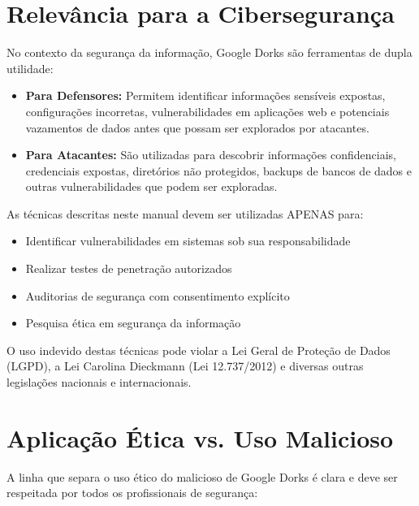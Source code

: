 \documentclass[12pt,a4paper]{book}
\begin{document}
\section{Relevância para a Cibersegurança}

No contexto da segurança da informação, Google Dorks são ferramentas de dupla utilidade:

\begin{itemize}
    \item \textbf{\textcolor{verdeestabilidade}{Para Defensores:}} Permitem identificar informações sensíveis expostas, configurações incorretas, vulnerabilidades em aplicações web e potenciais vazamentos de dados antes que possam ser explorados por atacantes.
    
    \item \textbf{\textcolor{vermelhoperigo}{Para Atacantes:}} São utilizadas para descobrir informações confidenciais, credenciais expostas, diretórios não protegidos, backups de bancos de dados e outras vulnerabilidades que podem ser exploradas.
\end{itemize}

\begin{alertbox}
As técnicas descritas neste manual devem ser utilizadas APENAS para:
\begin{itemize}
    \item Identificar vulnerabilidades em sistemas sob sua responsabilidade
    \item Realizar testes de penetração autorizados
    \item Auditorias de segurança com consentimento explícito
    \item Pesquisa ética em segurança da informação
\end{itemize}

O uso indevido destas técnicas pode violar a Lei Geral de Proteção de Dados (LGPD), a Lei Carolina Dieckmann (Lei 12.737/2012) e diversas outras legislações nacionais e internacionais.
\end{alertbox}

\section{Aplicação Ética vs. Uso Malicioso}

A linha que separa o uso ético do malicioso de Google Dorks é clara e deve ser respeitada por todos os profissionais de segurança:
\end{document}
